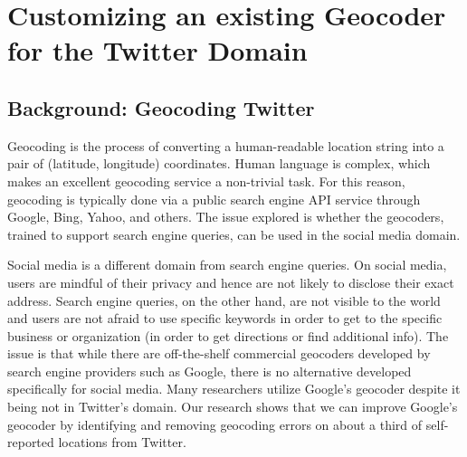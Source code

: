 \chapter{Customizing an existing Geocoder for the Twitter Domain}\label{chap2}

\section{Background: Geocoding Twitter}
Geocoding is the process of converting a human-readable location string into a pair of (latitude, longitude) coordinates. Human language is complex, which makes an excellent geocoding service a non-trivial task. For this reason, geocoding is typically done via a public search engine API service through Google, Bing, Yahoo, and others. The issue explored is whether the geocoders, trained to support search engine queries, can be used in the social media domain. 

Social media is a different domain from search engine queries. On social media, users are mindful of their privacy and hence are not likely to disclose their exact address. Search engine queries, on the other hand, are not visible to the world and users are not afraid to use specific keywords in order to get to the specific business or organization %
(in order to get directions or find additional info). The issue is that while there are off-the-shelf commercial geocoders developed by search engine providers such as Google, there is no alternative developed specifically for social media. Many researchers utilize Google's geocoder despite it being not in Twitter's domain. Our research shows that we can improve Google's geocoder by identifying and removing geocoding errors on about a third of self-reported locations from Twitter.

